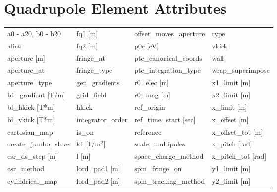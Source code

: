  \section{Quadrupole Element Attributes}
 \label{s:list.quadrupole}
 
 \begin{tabular}{llll} \toprule
a0 - a20, b0 - b20               & fq1 [m]                          & offset_moves_aperture            & type                             \\
alias                            & fq2 [m]                          & p0c [eV]                         & vkick                            \\
aperture [m]                     & fringe_at                        & ptc_canonical_coords             & wall                             \\
aperture_at                      & fringe_type                      & ptc_integration_type             & wrap_superimpose                 \\
aperture_type                    & gen_gradients                    & r0_elec [m]                      & x1_limit [m]                     \\
b1_gradient [T/m]                & grid_field                       & r0_mag [m]                       & x2_limit [m]                     \\
bl_hkick [T*m]                   & hkick                            & ref_origin                       & x_limit [m]                      \\
bl_vkick [T*m]                   & integrator_order                 & ref_time_start [sec]             & x_offset [m]                     \\
cartesian_map                    & is_on                            & reference                        & x_offset_tot [m]                 \\
create_jumbo_slave               & k1 [1/m$^2$]                     & scale_multipoles                 & x_pitch [rad]                    \\
csr_ds_step [m]                  & l [m]                            & space_charge_method              & x_pitch_tot [rad]                \\
csr_method                       & lord_pad1 [m]                    & spin_fringe_on                   & y1_limit [m]                     \\
cylindrical_map                  & lord_pad2 [m]                    & spin_tracking_method             & y2_limit [m]                     \\

\end{tabular}
